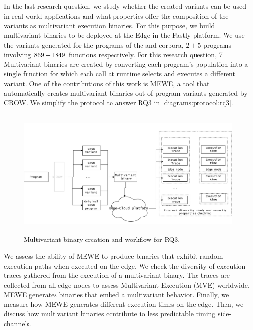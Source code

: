 
\section{\rqthree}

\newcommand{\mewe}{MEWE\xspace}



In the last research question, we study whether the created variants can be used in real-world applications and what properties offer the composition of the variants as multivariant execution binaries. For this purpose, we build multivariant binaries to be deployed at the Edge in the Fastly platform. We use the variants generated for the programs of the \corpussodium and \corpusqrcode corpora, $2 + 5$ programs involving $ 869 + 1849$ functions respectively. For this research question, 7 Multivariant binaries are created by converting each program's population into a single function for which each call at runtime selects and executes a different variant. One of the contributions of this work is \mewe, a tool that automatically creates multivariant binaries out of program variants generated by CROW. We simplify the protocol to answer RQ3 in \autoref{diagrams:protocol:rq3}.



\begin{figure}[h]
    \centering
    \includegraphics[height=2.50in]{diagrams/Rq3.pdf}
    \caption{Multivariant binary creation and workflow for RQ3.}
    \label{diagrams:protocol:rq3}
\end{figure}

We assess the ability of \mewe to produce binaries that exhibit random execution paths when executed on the edge. We check the diversity of execution traces gathered from the execution of a multivariant binary. The traces are collected from all edge nodes to assess Multivariant Execution (MVE) worldwide. \mewe generates binaries that embed a multivariant behavior. Finally, we measure how \mewe generates different execution times on the edge. Then, we discuss how multivariant binaries contribute to less predictable timing side-channels.

